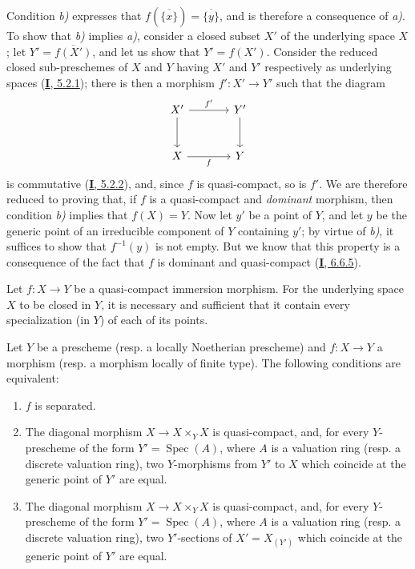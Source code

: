 Condition \emph{b)} expresses that $f(\overline{\{x\}})=\overline{\{y\}}$, and is
therefore a consequence of \emph{a)}. To show that \emph{b)} implies \emph{a)}, consider a closed
subset $X'$ of the underlying space $X$; let $Y'=\overline{f(X')}$, and
let us show that $Y'=f(X')$. Consider the reduced closed sub-preschemes of
$X$ and $Y$ having $X'$ and $Y'$ respectively as underlying spaces
(\hyperref[I.5.2.1]{\textbf{I}, 5.2.1}); there is then a morphism $f':X'\to Y'$ such
that the diagram
\[
\begin{tikzcd}[column sep=large,row sep=large]
X' \arrow[r,"f'"] \arrow[d] & Y' \arrow[d] \\
X \arrow[r,"f"'] & Y
\end{tikzcd}
\]
is commutative (\hyperref[I.5.2.2]{\textbf{I}, 5.2.2}), and, since $f$ is
quasi-compact, so is $f'$. We are therefore reduced to proving that, if
$f$ is a quasi-compact and \emph{dominant} morphism, then
condition \emph{b)} implies that $f(X)=Y$. Now let $y'$ be a point of $Y$, and let $y$
be the generic point of an irreducible component of $Y$ containing $y'$; by
virtue of \emph{b)}, it suffices to show that $f^{-1}(y)$ is not empty. But we know
that this property is a consequence of the fact that $f$ is dominant and
quasi-compact (\hyperref[I.6.6.5]{\textbf{I}, 6.6.5}).

\begin{corollary}[7.2.2]
\label{II.7.2.2}
Let $f:X\to Y$ be a quasi-compact immersion morphism. For the underlying
space $X$ to be closed in $Y$, it is necessary and sufficient that it contain
every specialization (in $Y$) of each of its points.
\end{corollary}

\begin{proposition}[7.2.3]
\label{II.7.2.3}
Let $Y$ be a prescheme \textup{(resp.} a locally Noetherian prescheme\textup{)} and $f:X\to Y$
a morphism \textup{(resp.} a morphism locally of finite type\textup{)}. The following
conditions are equivalent:
\begin{enumerate}
\item[\rm a)] $f$ is separated.
\item[\rm b)] The diagonal morphism $X\to X\times_YX$ is quasi-compact, and,
for every $Y$-prescheme of the form $Y'=\operatorname{Spec}(A)$, where $A$ is a
valuation ring \textup{(resp.} a discrete valuation ring\textup{)}, two
$Y$-morphisms from $Y'$ to $X$ which coincide at the generic point of $Y'$ are
equal.
\item[\rm c)] The diagonal morphism $X\to X\times_YX$ is quasi-compact, and,
for every $Y$-prescheme of the form $Y'=\operatorname{Spec}(A)$, where $A$ is a
valuation ring \textup{(resp.} a discrete valuation ring\textup{)}, two
$Y'$-sections of $X'=X_{(Y')}$ which coincide at the generic point of $Y'$ are
equal.
\end{enumerate}
\end{proposition}

